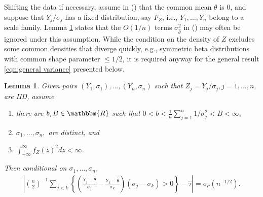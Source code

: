 \documentclass[12pt]{article}
\newtheorem{lemma}[theorem]{Lemma}
\newcommand{\z}{Z}
\newcommand{\y}{Y}
\newcommand{\thetahat}{\hat{\theta}}
\begin{document}
    Shifting the data if necessary, assume in ()
    that the common mean $\theta$ is $0$, and suppose that $\y_j/\sigma_j$
    has a fixed distribution, say $F_Z$, i.e., 
    $\y_1,\ldots,\y_n$ belong to a scale
    family. %
    Lemma \ref{lemma:sigma_theta term} states that the $O(1/n)$ terms $\sigma_{\thetahat}^2$  in () may often be ignored
    under this assumption. While the condition on the density of $Z$
    excludes some common densities that diverge quickly, e.g.,
    symmetric beta distributions with common shape parameter
    $\le 1/2$, it is required anyway for the general result \eqref{eqn:general variance} presented
    below.
    \begin{lemma}\label{lemma:sigma_theta term}
      Given pairs $(\y_1,\sigma_1),\ldots,(\y_n,\sigma_n)$ such that
      $\z_j=\y_j/\sigma_j,j=1,\ldots,n,$ are IID, assume
    \begin{enumerate}
      \item there are $b,B\in\mathbbm{R}$ such that
        $ 0 < b < \frac{1}{n}\sum_{j=1}^n1/\sigma_j^2 < B < \infty,$
        \item $\sigma_1,\ldots,\sigma_n,$ are distinct, and
      \item $\int_{-\infty}^\infty f_\z(z)^2dz < \infty$.
      \end{enumerate}
      Then conditional on $\sigma_1,\ldots,\sigma_n$,
      \begin{align}
        \left|{n\choose 2}^{-1}\sum_{j<k}\left\{\left(\frac{\y_j-\hat\theta}{\sigma_j}-\frac{\y_k-\hat\theta}{\sigma_k}\right)(\sigma_j-\sigma_k)>0\right\} - \hat\tau\right| = o_P(n^{-1/2}).
      \end{align}
    \end{lemma}
\end{document}
